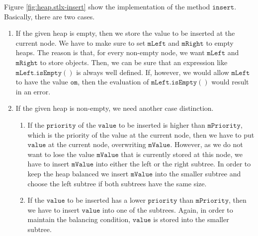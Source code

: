 \noindent
Figure \ref{fig:heap.stlx-insert} show the implementation of the method $\mathtt{insert}$.
Basically, there are two cases.
\begin{enumerate}
\item If the given heap is empty, then we store the value to be inserted at the current node.
      We have to make sure to set $\mathtt{mLeft}$ and $\mathtt{mRight}$ to empty heaps.  The reason is
      that, for every non-empty node, we want $\mathtt{mLeft}$ and $\mathtt{mRight}$ to store objects.
      Then, we can be sure that an expression like $\mathtt{mLeft}.\mathtt{isEmpty}()$ is always well defined.
      If, however, we would allow $\mathtt{mLeft}$ to have the value $\mathtt{om}$, then the evaluation
      of $\mathtt{mLeft}.\mathtt{isEmpty}()$ would result in an error.
\item If the given heap is non-empty, we need another case distinction.
  \begin{enumerate}
  \item If the $\mathtt{priority}$ of the $\mathtt{value}$ to be inserted is higher than
        $\mathtt{mPriority}$, which is the priority of the value at the current node, then we have to 
        put $\mathtt{value}$ at the current node, overwriting $\mathtt{mValue}$.  However, as we do not want
        to lose the value $\mathtt{mValue}$ that is currently stored at this node, we have to insert 
        $\mathtt{mValue}$ into either the left or the right subtree.  In order to keep the heap
        balanced we insert $\mathtt{mValue}$ into the smaller subtree and choose the left subtree if
        both subtrees have the same size.
  \item If the $\mathtt{value}$ to be inserted has a lower $\mathtt{priority}$ than $\mathtt{mPriority}$, then we have
        to insert $\mathtt{value}$ into one of the subtrees.  Again, in order to maintain the balancing
        condition, $\mathtt{value}$ is stored into the smaller subtree.
  \end{enumerate}
\end{enumerate}

